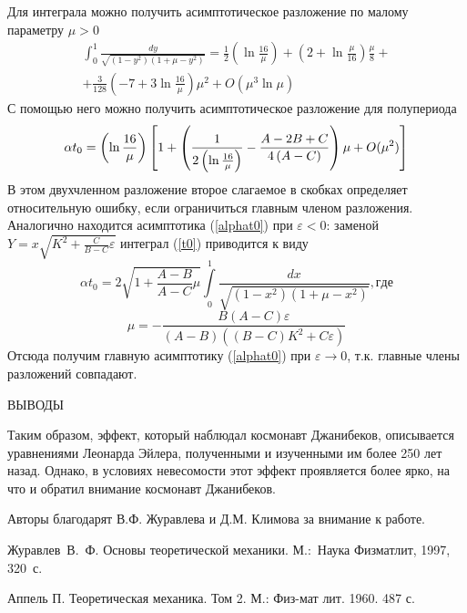 \documentclass[14pt,a4paper]{extarticle}
\def\DS{\displaystyle}
\def\eps{\varepsilon}
\begin{document}
Для интеграла можно получить асимптотическое разложение по малому параметру $\mu>0$
$$\begin{array}{l} \DS\int_{0}^{1}\frac{dy}{\sqrt{\left( 1-y^{2}\right) \left(
1+\mu -y^{2}\right) }}=\frac{1}{2}\left( \ln \frac{16}{\mu }\right) +\left(2+\ln 
\frac{\mu }{16}\right)\frac{\mu }{8}+\\[2ex]+\DS\frac{3}{128}\left(-7+3\ln \frac{16}{\mu }\right)\mu
^{2}+O(\mu ^{3}\ln \mu)\end{array} $$
С помощью него можно получить асимптотическое разложение для полупериода 
$$\alpha t_{0}=
\left( \ln \frac{16}{\mu }\right) \left[ 1+\left( \frac{1}{2\left( \ln \frac{%
16}{\mu }\right) }-\frac{A-2B+C}{4\left( A-C\right) }\right) \mu +O(\mu ^{2})%
\right] $$
В этом двухчленном разложение второе слагаемое в скобках определяет относительную ошибку, если ограничиться главным членом разложения.\\
Аналогично находится асимптотика (\ref{alphat0}) при $\eps<0$: заменой $Y=x\sqrt{K^2+\frac{C}{B-C}\varepsilon}$ интеграл (\ref{t0}) приводится к виду
$$
\alpha t_0=2\sqrt{1+\frac{A-B}{A-C}\mu}{\int\limits_{0}^{1}\frac{dx}{\sqrt{(1-x^2)(1+\mu-x^2)}}}, где
$$
$$
\mu=-\frac{B(A-C)\varepsilon}{\left(A-B\right)\left((B-C)K^2+C\varepsilon\right)}
$$
Отсюда получим главную асимптотику (\ref{alphat0}) при $\eps\rightarrow 0$, т.к. главные члены разложений совпадают.

\newpage


{ВЫВОДЫ} 


\smallskip
Таким образом, эффект, который наблюдал космонавт Джанибеков, описывается уравнениями Леонарда Эйлера, полученными и изученными им более 250 лет назад. Однако, в условиях невесомости этот эффект проявляется более ярко, на что и обратил внимание космонавт Джанибеков. 


\smallskip

Авторы благодарят В.Ф. Журавлева и Д.М. Климова за внимание к работе.

\begin{thebibliography}{99}
 Журавлев~В.~Ф. Основы теоретической механики.
М.:~Наука Физматлит, 1997, 320~с.

 Аппель П. Теоретическая механика. Том 2. М.: Физ-мат лит. 1960. 487 с.
\end{thebibliography}
\end{document}
